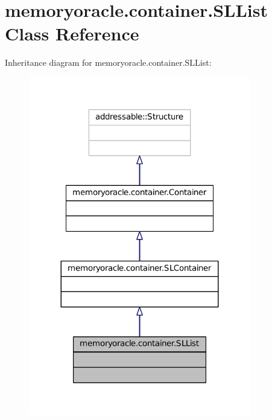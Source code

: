 \hypertarget{classmemoryoracle_1_1container_1_1SLList}{}\section{memoryoracle.\+container.\+S\+L\+List Class Reference}
\label{classmemoryoracle_1_1container_1_1SLList}


Inheritance diagram for memoryoracle.\+container.\+S\+L\+List\+:\nopagebreak
\begin{figure}[H]
\begin{center}
\leavevmode
\includegraphics[width=275pt]{classmemoryoracle_1_1container_1_1SLList__inherit__graph}
\end{center}
\end{figure}


